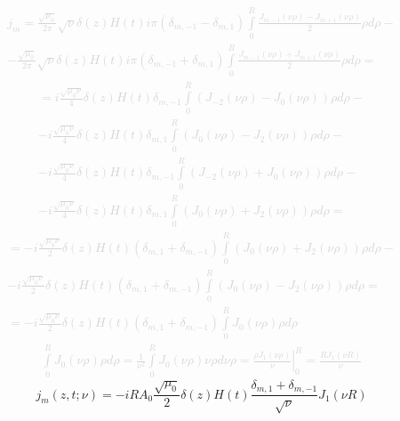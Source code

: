 %
\textcolor{lightgray} { \begin{equation*} \begin{aligned}
j_m = \frac{\sqrt{\mu_0}}{2\pi} \sqrt{\nu} \delta(z) H(t) 
i\pi ( \delta_{m,-1} - \delta_{m,1} ) \int \limits_{0}^{R} 
\frac{J_{m-1} (\nu \rho) - J_{m+1} (\nu \rho)}{2} \rho d \rho - \\
- \frac{\sqrt{\mu_0}}{2\pi} \sqrt{\nu} \delta(z) H(t) 
i\pi ( \delta_{m,-1} + \delta_{m,1} ) \int \limits_{0}^{R} 
\frac{J_{m-1} (\nu \rho) + J_{m+1} (\nu \rho)}{2} \rho d \rho =
\end{aligned} \end{equation*} }
%
\textcolor{lightgray} { \begin{equation*} \begin{aligned}
= i \frac{\sqrt{\mu_0 \nu}}{4} \delta(z) H(t)
\delta_{m,-1} \int \limits_{0}^{R} \left( J_{-2} (\nu \rho) - 
J_0 (\nu \rho) \right) \rho d \rho - \\
- i \frac{\sqrt{\mu_0 \nu}}{4} \delta(z) H(t)
\delta_{m,1} \int \limits_{0}^{R} \left( J_{0} (\nu \rho) - 
J_2 (\nu \rho) \right) \rho d \rho - \\
- i \frac{\sqrt{\mu_0 \nu}}{4} \delta(z) H(t)
\delta_{m,-1} \int \limits_{0}^{R} \left( J_{-2} (\nu \rho) +  
J_0 (\nu \rho) \right) \rho d \rho - \\
- i \frac{\sqrt{\mu_0 \nu}}{4} \delta(z) H(t)
\delta_{m,1} \int \limits_{0}^{R} \left( J_{0} (\nu \rho) +
J_2 (\nu \rho) \right) \rho d \rho =
\end{aligned} \end{equation*} }
%
\textcolor{lightgray} { \begin{equation*} \begin{aligned}
= - i \frac{\sqrt{\mu_0 \nu}}{2} \delta(z) H(t) 
(\delta_{m,1} + \delta_{m,-1}) 
\int \limits_{0}^{R} \left( J_{0} (\nu \rho) + 
J_2 (\nu \rho) \right) \rho d \rho - \\
- i \frac{\sqrt{\mu_0 \nu}}{2} \delta(z) H(t) 
(\delta_{m,1} + \delta_{m,-1}) 
\int \limits_{0}^{R} \left( J_{0} (\nu \rho) -
J_2 (\nu \rho) \right) \rho d \rho = \\
= - i \frac{\sqrt{\mu_0 \nu}}{2} \delta(z) H(t) 
(\delta_{m,1} + \delta_{m,-1}) 
\int \limits_{0}^{R} J_{0} (\nu \rho) \rho d \rho
\end{aligned} \end{equation*} }
%
\textcolor{lightgray} { \begin{equation*} \begin{aligned}
\int \limits_{0}^{R} J_{0} (\nu \rho) \rho d \rho = 
\frac{1}{\nu^2} \int \limits_{0}^{R} J_{0} (\nu \rho) \nu \rho d \nu \rho =
\left. \frac{\rho J_1 (\nu \rho) }{\nu} \right|_{0}^{R} = 
\frac{R J_1 (\nu R)}{\nu}
\end{aligned} \end{equation*} }
%
\begin{equation} 
j_m (z, t; \nu) = - i R A_0 \frac{\sqrt{\mu_0}}{2} \delta(z) H(t) 
\frac{\delta_{m,1} + \delta_{m,-1}}{\sqrt{\nu}} J_1 (\nu R)
\end{equation}

